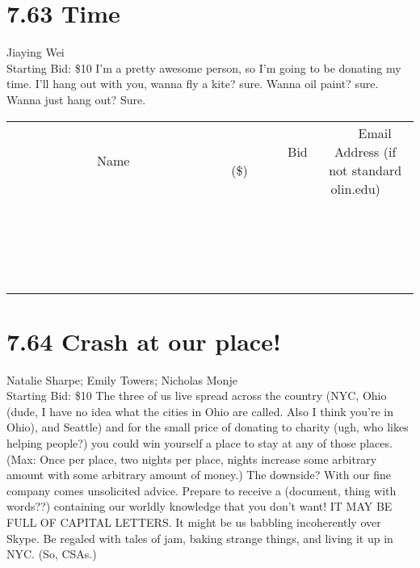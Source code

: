 \documentclass[11pt]{article}
\begin{document}
\section*{7.63 Time}
Jiaying Wei
\\
Starting Bid: \$10
\newline
I'm a pretty awesome person, so I'm going to be donating my time. I'll hang out with you, wanna fly a kite? sure. Wanna oil paint? sure. Wanna just hang out? Sure.
\\[3ex]
\begin{tabular}{c c c}
~~~~~~~~~~~~~Name~~~~~~~~~~~~~ & ~~~~~~~~~Bid (\$)~~~~~~~~~  & ~~~Email Address (if not standard olin.edu)~~~\\
 & & \\
\hline
 & & \\
\hline
 & & \\
\hline
 & & \\
\hline
 & & \\
\hline
 & & \\
\hline
 & & \\
\hline
 & & \\
\hline
 & & \\
\hline
 & & \\
\hline
 & & \\
\hline
 & & \\
\hline
 & & \\
\hline
 & & \\
\hline
 & & \\
\hline
 & & \\
\hline
 & & \\
\hline
 & & \\
\hline
 & & \\
\hline
\end{tabular}
\newpage
\section*{7.64 Crash at our place!}
Natalie Sharpe; Emily Towers; Nicholas Monje
\\
Starting Bid: \$10
\newline
The three of us live spread across the country (NYC, Ohio (dude, I have no idea what the cities in Ohio are called.  Also I think you're in Ohio), and Seattle) and for the small price of donating to charity (ugh, who likes helping people?) you could win yourself a place to stay at any of those places.  (Max: Once per place, two nights per place, nights increase some arbitrary amount with some arbitrary amount of money.)  The downside?  With our fine company comes unsolicited advice.  Prepare to receive a (document, thing with words??) containing our worldly knowledge that you don't want!  IT MAY BE FULL OF CAPITAL LETTERS.  It might be us babbling incoherently over Skype.  Be regaled with tales of jam, baking strange things, and living it up in NYC.  (So, CSAs.)  
\end{document}

